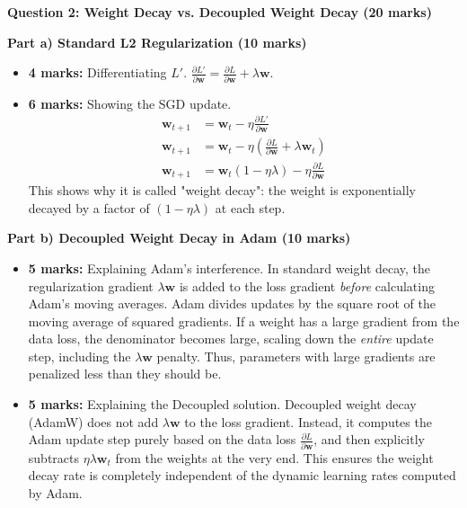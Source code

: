 \documentclass[11pt]{article}
\begin{document}
\textbf{Question 2: Weight Decay vs. Decoupled Weight Decay (20 marks)}

\textbf{Part a) Standard L2 Regularization (10 marks)}
\begin{itemize}
    \item \textbf{4 marks:} Differentiating $L'$. $\frac{\partial L'}{\partial \mathbf{w}} = \frac{\partial L}{\partial \mathbf{w}} + \lambda \mathbf{w}$.
    \item \textbf{6 marks:} Showing the SGD update. 
    \begin{align*}
    \mathbf{w}_{t+1} &= \mathbf{w}_t - \eta \frac{\partial L'}{\partial \mathbf{w}} \\
    \mathbf{w}_{t+1} &= \mathbf{w}_t - \eta \left( \frac{\partial L}{\partial \mathbf{w}} + \lambda \mathbf{w}_t \right) \\
    \mathbf{w}_{t+1} &= \mathbf{w}_t(1 - \eta \lambda) - \eta \frac{\partial L}{\partial \mathbf{w}}
    \end{align*}
    This shows why it is called "weight decay": the weight is exponentially decayed by a factor of $(1-\eta\lambda)$ at each step.
\end{itemize}

\textbf{Part b) Decoupled Weight Decay in Adam (10 marks)}
\begin{itemize}
    \item \textbf{5 marks:} Explaining Adam's interference. In standard weight decay, the regularization gradient $\lambda \mathbf{w}$ is added to the loss gradient \textit{before} calculating Adam's moving averages. Adam divides updates by the square root of the moving average of squared gradients. If a weight has a large gradient from the data loss, the denominator becomes large, scaling down the \textit{entire} update step, including the $\lambda \mathbf{w}$ penalty. Thus, parameters with large gradients are penalized less than they should be.
    \item \textbf{5 marks:} Explaining the Decoupled solution. Decoupled weight decay (AdamW) does not add $\lambda \mathbf{w}$ to the loss gradient. Instead, it computes the Adam update step purely based on the data loss $\frac{\partial L}{\partial \mathbf{w}}$, and then explicitly subtracts $\eta \lambda \mathbf{w}_t$ from the weights at the very end. This ensures the weight decay rate is completely independent of the dynamic learning rates computed by Adam.
\end{itemize}
\end{document}
